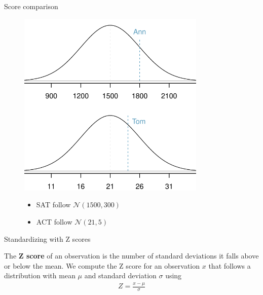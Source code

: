 \documentclass[12pt,a4paper]{beamer}
\begin{document}
\begin{frame}{Score comparison}
	
	\begin{figure}
	 	\centering
		\begin{minipage}{.7\textwidth}
		  \centering
	\includegraphics[width=0.8\textwidth]{figures/satActNormals/satActNormals}
	\end{minipage}%
	\begin{minipage}{0.3\textwidth}
	  \small \begin{itemize}
	 \item SAT follow $\mathcal{N}(1500,300)$\\
	\item ACT follow $\mathcal{N}(21,5)$
\end{itemize}
\end{minipage}
	\end{figure}
\end{frame}
\begin{frame}{Standardizing with Z scores 
}
\begin{framed}
The \textbf{Z score} of an observation is the number of standard deviations it falls above or below the mean. We compute the Z score for an observation $x$ that follows a distribution with mean $\mu$ and standard deviation $\sigma$ using
\begin{eqnarray*}
Z = \frac{x-\mu}{\sigma}
\end{eqnarray*}
\end{framed}

\end{frame}
\end{document}
